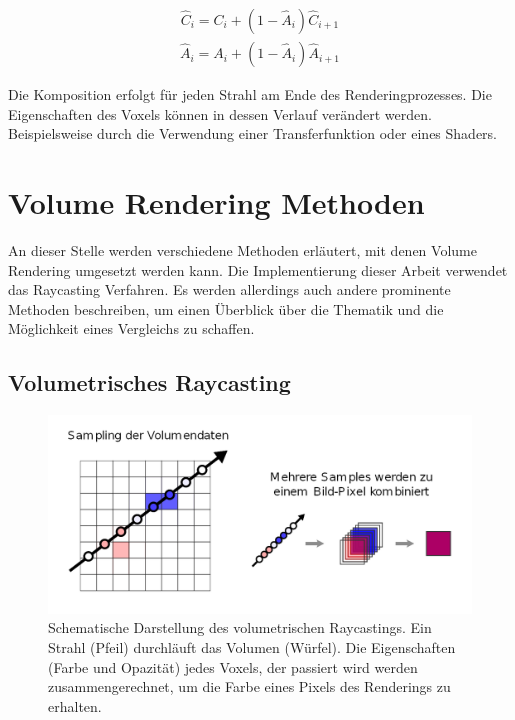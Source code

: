 \begin{align}
\hat{C}_{i}=C_{i}+(1-\hat{A}_{i})\hat{C}_{i+1}
\end{align}
\begin{align}
\hat{A}_{i}=A_{i}+(1-\hat{A}_{i})\hat{A}_{i+1}
\end{align}

Die Komposition erfolgt für jeden Strahl am Ende des Renderingprozesses. Die Eigenschaften des Voxels können in dessen Verlauf verändert werden. Beispielsweise durch die Verwendung einer Transferfunktion oder eines Shaders.


\section{Volume Rendering Methoden}

An dieser Stelle werden verschiedene Methoden erläutert, mit denen Volume Rendering umgesetzt werden kann. Die Implementierung dieser Arbeit verwendet das Raycasting Verfahren. Es werden allerdings auch andere prominente Methoden beschreiben, um einen Überblick über die Thematik und die Möglichkeit eines Vergleichs zu schaffen.

\subsection{Volumetrisches Raycasting}
\label{rayCasting}


\begin{figure}[!htb]
	\centering
	\includegraphics[width=0.7\linewidth]{images/rayCasting.png}
	\caption{Schematische Darstellung des volumetrischen Raycastings. Ein Strahl (Pfeil) durchläuft das Volumen (Würfel). Die Eigenschaften (Farbe und Opazität) jedes Voxels, der passiert wird werden zusammengerechnet, um die Farbe eines Pixels des Renderings zu erhalten.}
	\label{img:rayCasting}
\end{figure}
\FloatBarrier

